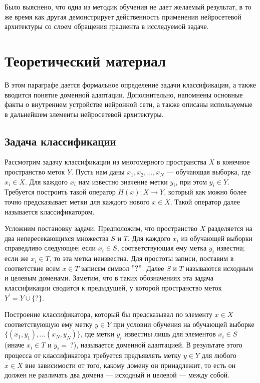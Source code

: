 \documentclass[14pt, a4paper]{extarticle}
\begin{document}
Было выяснено, что одна из методик обучения не дает желаемый результат, в то же время как другая демонстрирует действенность применения нейросетевой архитектуры со слоем обращения градиента в исследуемой задаче.

\newpage 

\section{Теоретический материал}
\label{paragraph:theory}

В этом параграфе дается формальное определение задачи классификации, а также вводится понятие доменной адаптации. Дополнительно, напомнены основные факты о внутреннем устройстве нейронной сети, а также описаны используемые в дальнейшем элементы нейросетевой архитектуры.

\subsection*{Задача классификации}
\label{class_task}

Рассмотрим задачу классификации из многомерного пространства $X$ в конечное пространство меток $Y$. Пусть нам даны ${x_1, x_2, ..., x_N}$ — обучающая выборка, где $x_i \in X$. Для каждого $x_i$ нам известно значение метки $y_i$, при этом $y_i \in Y$. Требуется построить такой оператор $H(x): X \rightarrow Y$, который как можно более точно предсказывает метки для каждого нового $x \in X$. Такой оператор далее называется классификатором.

Усложним постановку задачи. Предположим, что пространство $X$ разделяется на два непересекающихся множества $S$ и $T$. Для каждого $x_i$ из обучающей выборки справедливо следующее: если $x_i \in S$, соответствующая ему метка $y_i$ известна; если же $x_i \in T$, то эта метка неизвестна. Для простоты записи, поставим в соответствие всем $x \in T$ записям символ $"\mathbb{?}"$. Далее $S$ и $T$ называются исходным и целевым доменами. Заметим, что в таких обозначениях эта задача классификации сводится к предыдущей, у которой пространство меток $Y^{'} = Y \cup \{?\}$.


 Построение классификатора, который бы предсказывал по элементу $x \in X$ соответствующую ему метку $y \in Y$ при условии обучения на обучающей выборке $\{(x_1, y_1), ... (x_N, y_N)\}$, где метки $y_i$ известны лишь для элементов $x_i \in S$ (иначе $x_i \in T$ и  $y_i =~?$), называется доменной адаптацией. В результате этого процесса от классификатора требуется предъявлять метку $y \in Y$ для любого $x \in X$ вне зависимости от того, какому домену он принадлежит, то есть он должен не различать два домена — исходный и целевой — между собой. 
\end{document}
